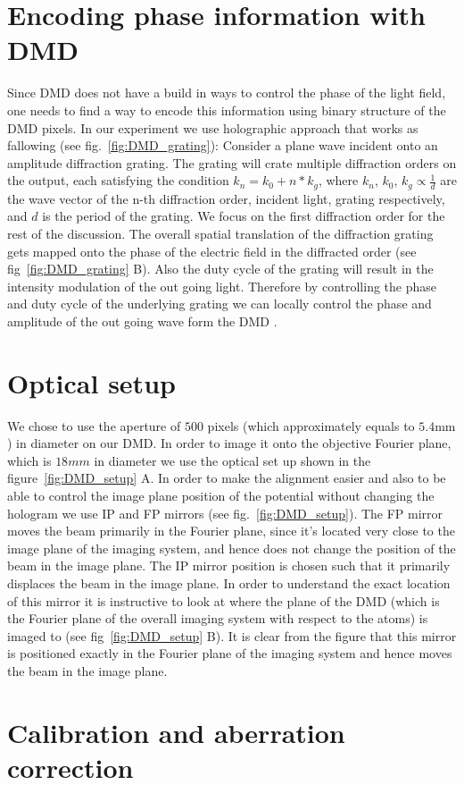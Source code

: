 \section{Encoding phase information with DMD}
Since DMD does not have a build in ways to control the phase of the light field, one needs to find a way to encode this information using binary structure of the DMD pixels. In our experiment we use holographic approach that works as fallowing (see fig.~\ref{fig:DMD_grating}): Consider a plane wave incident onto an amplitude diffraction grating. The grating will crate multiple diffraction orders on the output, each satisfying the condition $k_n = k_0 + n*k_g$, where $k_n$, $k_0$, $k_g \propto \frac{1}{d}$ are the wave vector of the n-th diffraction order, incident light, grating respectively, and $d$ is the period of the grating. We focus on the first diffraction order for the rest of the discussion. The overall spatial translation of the diffraction grating gets mapped onto the phase of the electric field in the diffracted order (see fig~\ref{fig:DMD_grating} B). Also the duty cycle of the grating will result in the intensity modulation of the out going light. Therefore by controlling the phase and duty cycle of the underlying grating we can locally control the phase and amplitude of the out going wave form the DMD \cite{Zupanchich thesis}.

\section{Optical setup}
We chose to use the aperture of $500$ pixels (which approximately equals to $5.4 \mathrm{mm}$) in diameter on our DMD. In order to image it onto the objective Fourier plane, which is $18 mm$ in diameter we use the optical set up shown in the figure~\ref{fig:DMD_setup} A. In order to make the alignment easier and also to be able to control the image plane position of the potential without changing the hologram we use IP and FP mirrors (see fig.~\ref{fig:DMD_setup}). The FP mirror moves the beam primarily in the Fourier plane, since it's located very close to the image plane of the imaging system, and hence does not change the position of the beam in the image plane. The IP mirror position is chosen such that it primarily displaces the beam in the image plane. In order to understand the exact location of this mirror it is instructive to look at where the plane of the DMD (which is the Fourier plane of the overall imaging system with respect to the atoms) is imaged to (see fig~\ref{fig:DMD_setup} B). It is clear from the figure that this mirror is positioned exactly in the Fourier plane of the imaging system and hence moves the beam in the image plane.

\section{Calibration and aberration correction}

\section{}
 

